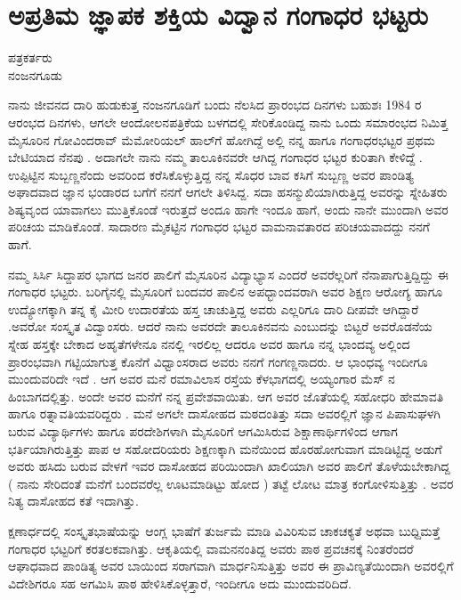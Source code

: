 \chapter{ಅಪ್ರತಿಮ ಜ್ಞಾಪಕ ಶಕ್ತಿಯ ವಿದ್ವಾನ ಗಂಗಾಧರ ಭಟ್ಟರು}

\begin{center}

ಪತ್ರಕರ್ತರು\\  
ನಂಜನಗೂಡು
\end{center}

ನಾನು ಜೀವನದ ದಾರಿ ಹುಡುಕುತ್ತ ನಂಜನಗೂಡಿಗೆ ಬಂದು ನೆಲಸಿದ ಪ್ರಾರಂಭದ ದಿನಗಳು ಬಹುಶಃ 1984 ರ ಆರಂಭದ ದಿನಗಳು,  ಆಗಲೇ  ಆಂದೋಲನಪತ್ರಿಕೆಯ ಬಳಗದಲ್ಲಿ ಸೇರಿಕೊಂಡಿದ್ದ ನಾನು ಒಂದು ಸಮಾರಂಭದ ನಿಮಿತ್ತ ಮೈಸೂರಿನ  ಗೋವಿಂದರಾವ್ ಮೆಮೋರಿಯಲ್ ಹಾಲ್‍ಗೆ   ಹೋಗಿದ್ದೆ ಅಲ್ಲಿ ನನ್ನ ಹಾಗೂ ಗಂಗಾಧರಭಟ್ಟರ ಪ್ರಥಮ ಬೇಟಿಯಾದ ನೆನಪು . ಅದಾಗಲೇ ನಾನು ನಮ್ಮ ತಾಲೂಕಿನವರೇ ಆಗಿದ್ದ  ಗಂಗಾಧರ ಭಟ್ಟರ ಕುರಿತಾಗಿ ಕೇಳಿದ್ದೆ .   ಉಪ್ಪಿಟ್ಟಿನ ಸುಬ್ಬಣ್ಣನೆಂದು ಅವರಿಂದ ಕರೆಸಿಕೊಳ್ಳುತ್ತಿದ್ದ ನನ್ನ ಸೊಧರ ಬಾವ ಕಸಿಗೆ ಸುಬ್ಬಣ್ಣ  ಅವರ ಪಾಂಡಿತ್ಯ  ಅಘಾದವಾದ ಜ್ಞಾನ ಭಂಡಾರದ ಬಗೆಗೆ ನನಗೆ ಆಗಲೇ ತಿಳಿಸಿದ್ದ. ಸದಾ  ಹಸನ್ಮುಖಿಯಾಗಿರುತ್ತಿದ್ದ  ಅವರನ್ನು ಸ್ನೇಹಿತರು ಶಿಷ್ಯವೃಂದ ಯಾವಾಗಲು ಮುತ್ತಿಕೊಂಡೆ ಇರುತ್ತದೆ ಅಂದೂ ಹಾಗೇ  ಇಂದೂ ಹಾಗೆ, ಅಂದು ನಾನೇ ಮುಂದಾಗಿ ಅವರ  ಪರಿಚಯ ಮಾಡಿಕೊಂಡೆ.  ಸಾದಾರಣ ಮೈಕಟ್ಟಿನ  ಗಂಗಾಧರ ಭಟ್ಟರ ವಾಮನಾವತಾರದ ಪರಿಚಯವಾದದ್ದು ನನಗೆ ಹಾಗೆ.

ನಮ್ಮ  ಸಿರ್ಸಿ ಸಿದ್ದಾಪರ  ಭಾಗದ ಜನರ ಪಾಲಿಗೆ ಮೈಸೂರಿನ ವಿದ್ಯಾಭ್ಯಾಸ  ಎಂದರೆ ಅವರೆಲ್ಲರಿಗೆ ನೆನಾಪಾಗುತ್ತಿದ್ದಿದ್ದು  ಈ ಗಂಗಾಧರ ಭಟ್ಟರು. ಬರಿಗೈನಲ್ಲಿ ಮೈಸೂರಿಗೆ ಬಂದವರ ಪಾಲಿನ ಅಪಧ್ಭಾಂದವರಾಗಿ  ಅವರ ಶಿಕ್ಷಣ ಆರೋಗ್ಯ ಹಾಗೂ ಉದ್ಯೋಗಕ್ಕಾಗಿ   ತನ್ನ ಕೈ ಮೀರಿ  ಉದಾರತೆಯ ಹಸ್ತ ಚಾಚುತ್ತಿದ್ದ  ಅವರು ಎಲ್ಲರಿಗೂ ದಾರಿ ದೀಪವೇ  ಆಗಿದ್ದಾರೆ .ಅವರೋ ಸಂಸ್ಕೃತ ವಿದ್ವಾಂಸರು. ಆದರೆ ನಾನು  ಅವರದೇ ತಾಲೂಕಿನವನು ಎಂಬುದನ್ನು ಬಿಟ್ಟರೆ  ಅವರೊಡನೆಯ  ಸ್ನೇಹ ಹಸ್ತಕ್ಕೇ ಬೇಕಾದ ಅಹೃತೆಗಳೇನೂ ನನಲ್ಲಿ ಇರಲಿಲ್ಲ   ಆದರೂ  ಅವರ ಹಾಗೂ ನನ್ನ ಭಾಂದವ್ಯ     ಅಲ್ಲಿಂದ ಪ್ರಾರಂಭವಾಗಿ ಗಟ್ಟಿಯಾಗುತ್ತ ಕೊನೆಗೆ ವಿಧ್ವಾಂಸರಾದ ಅವರು  ನನಗೆ ಗಂಗಣ್ಣನಾದರು. ಆ ಭಾಂಧವ್ಯ ಇಂದೀಗೂ ಮುಂದುವರಿದೇ ಇದೆ .  ಆಗ ಅವರ ಮನೆ  ರಮಾವಿಲಾಸ ರಸ್ತೆಯ ಕೆಳಭಾಗದಲ್ಲಿ ಅಯ್ಯಂಗಾರ ಮೆಸ್ ನ ಹಿಂಬಾಗದಲ್ಲಿತ್ತು.   ಅಂದೇ ಅವರ ಮನೆಗೆ ನನ್ನ ಪ್ರವೇಶವಾಯಿತು.  ಆಗ ಅವರ ಜೊತೆಯಲ್ಲಿ ಸಹೋಧರಿ ಹೇಮಾವತಿ ಹಾಗೂ ರತ್ನಾವತಿಯವರಿದ್ದರು  . ಮನೆ ಅಗಲೇ  ದಾಸೋಹದ ಮಠದಂತಿತ್ತು  ಸದಾ ಅವರಲ್ಲಿಗೆ ಜ್ಞಾನ ಪಿಪಾಸುಘಳಗಿ ಬರುವ ವಿದ್ಯಾರ್ಥಿಗಳು ಹಾಗೂ ಪರದೇಶಿಗಳಾಗಿ ಮೈಸೂರಿಗೆ ಆಗಮಿಸಿರುವ ಶಿಕ್ಷಾಣಾರ್ಥಿಗಳಿಂದ   ಆಗಾಗ ಭರ್ತಿಯಾಗಿರುತ್ತಿತ್ತು ಪಾಪ ಆ ಸಹೋದರಿಯರು ಶಿಕ್ಷಣಕ್ಕಾಗಿ ಮನೆಯಿಂದ ಹೊರಹೋಗುವಾಗ   ಮಾಡಿಟ್ಟಿದ್ದ ಅಡುಗೆ ಅವರು ಹಸಿದು ಬರುವ ವೇಳಗೆ ಇವರ ದಾಸೋಹದ ಪರಿಯಿಂದಾಗಿ  ಖಾಲಿಯಾಗಿ ಅವರ ಪಾಲಿಗೆ ತೊಳೆಯಬೇಕಾಗಿದ್ದ ( ನಾನು  ಸೇರಿದಂತೆ ಮನೆಗೆ ಬಂದವರೆಲ್ಲ ಊಟಮಾಡಿಟ್ಟು ಹೋದ )   ತಟ್ಟೆ ಲೋಟ ಮಾತ್ರ ಕಂಗೋಳಿಸುತ್ತಿತ್ತು . ಅವರ ನಿತ್ಯ ದಾಸೋಹದ ಕತೆ ಇದಾಗಿತ್ತು. 

ಕ್ಷಣಾರ್ಧದಲ್ಲಿ  ಸಂಸ್ಕೃತಭಾಷೆಯನ್ನು ಆಂಗ್ಲ ಭಾಷೆಗೆ ತುರ್ಜಮೆ ಮಾಡಿ  ವಿವಿರಿಸುವ ಚಾಕಚಕ್ಯತೆ ಅಥವಾ ಬುಧ್ದಿಮತ್ತೆ ಗಂಗಾಧರ ಭಟ್ಟರಿಗೆ ಕರತಲಕವಾಗಿತ್ತು.  ಆಕೃತಿಯಲ್ಲಿ ವಾಮನನಂತಿದ್ದ ಅವರು ಪಾಠ ಪ್ರವಚನಕ್ಕೆ ನಿಂತರೆಂದರೆ ಆಘಾಧವಾದ ಪಾಂಡಿತ್ಯ ಅವರ ಬಾಯಿಂದ ಸರಾಗವಾಗಿ ಮಾರ್ಧನಿಸುತ್ತಿತ್ತು ಅವರ ಈ ಪ್ರಾವಿಣ್ಯತೆಯಿಂದಾಗಿ  ಅವರಲ್ಲಿಗೆ ವಿದೇಶಿಗರೂ ಸಹ  ಅಗಮಿಸಿ ಪಾಠ ಹೇಳಿಸಿಕೊಳ್ಳತ್ತಾರೆ, ಇಂದೀಗೂ ಅದು ಮುಂದುವರಿದಿದೆ.

